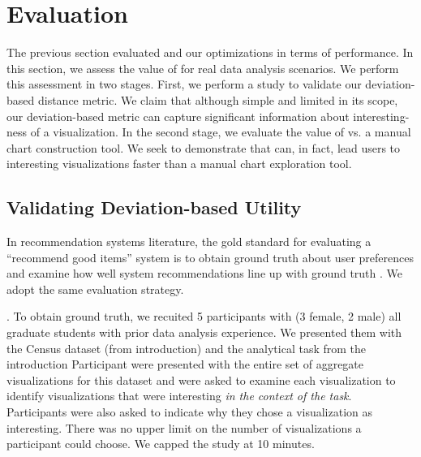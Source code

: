 
\section{Evaluation}
\label{sec:user_study}

The previous section evaluated \SeeDB and our optimizations in terms of 
performance.
In this section, we assess the value of \SeeDB for real data analysis 
scenarios.
We perform this assessment in two stages. 
First, we perform a study to validate our deviation-based distance metric.
We claim that although simple and limited in its scope, our deviation-based
metric can capture significant information about interesting-ness
of a visualization.
In the second stage, we evaluate the value of \SeeDB vs. a manual chart
construction tool.
We seek to demonstrate that \SeeDB can, in fact, lead users to interesting
visualizations faster than a manual chart exploration tool.

\subsection{Validating Deviation-based Utility}
\label{sec:validating_metric}
In recommendation systems literature, the gold standard for evaluating
a ``recommend good items'' \cite{} system is to obtain ground truth 
about user preferences and examine how well system recommendations line
up with ground truth \cite{}.
We adopt the same evaluation strategy.

.
To obtain ground truth, we recuited 5 participants with (3 female, 2
male) all graduate students with prior data analysis experience.
We presented them with the Census dataset (from introduction) and the analytical
task from the introduction 
Participant were presented with the entire set of aggregate visualizations 
for this dataset and were asked to examine each visualization to identify 
visualizations that were interesting {\it in the context of the task}.
Participants were also asked to indicate why they chose a visualization
as interesting.
There was no upper limit on the number of visualizations a participant could
choose.
We capped the study at 10 minutes.

